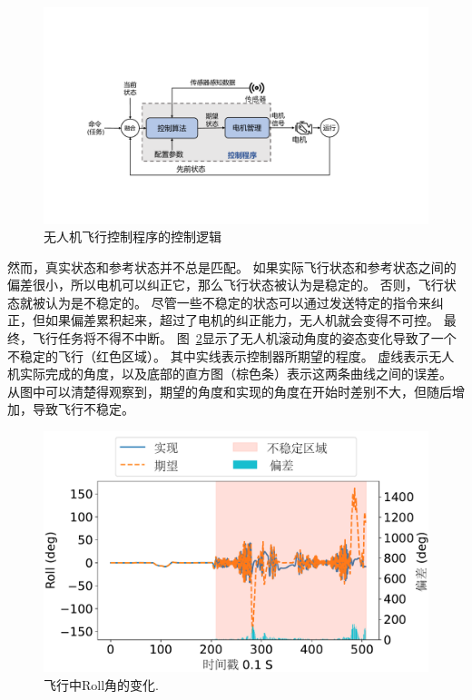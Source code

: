 \begin{figure}[ht]
  \centering
    \includegraphics[width=\columnwidth]{fig/background/rawcontrol.pdf}
\caption{无人机飞行控制程序的控制逻辑}
\label{fig:rawcontrol} 
\end{figure}

然而，真实状态和参考状态并不总是匹配。
如果实际飞行状态和参考状态之间的偏差很小，所以电机可以纠正它，那么飞行状态被认为是稳定的。
否则，飞行状态就被认为是不稳定的。
尽管一些不稳定的状态可以通过发送特定的指令来纠正，但如果偏差累积起来，超过了电机的纠正能力，无人机就会变得不可控。
最终，飞行任务将不得不中断。
图~\ref{fig:des&ach}显示了无人机滚动角度的姿态变化导致了一个不稳定的飞行（红色区域）。
其中实线表示控制器所期望的程度。
虚线表示无人机实际完成的角度，以及底部的直方图（棕色条）表示这两条曲线之间的误差。
从图中可以清楚得观察到，期望的角度和实现的角度在开始时差别不大，但随后增加，导致飞行不稳定。

\begin{figure}[ht]
  \centering
    \includegraphics[width=0.9\columnwidth]{fig/background/des&ach.pdf}
\caption{飞行中Roll角的变化.}
\label{fig:des&ach} 
\end{figure}


